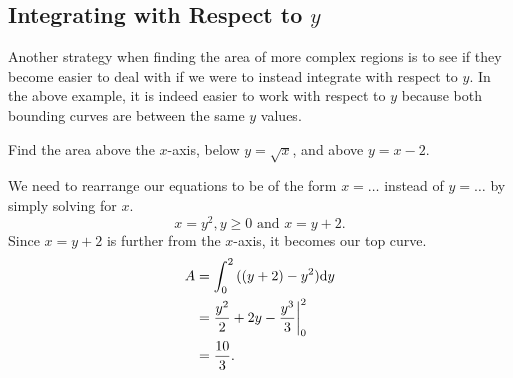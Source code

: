 \subsection{Integrating with Respect to $y$}
Another strategy when finding the area of more complex regions is to see if they become easier to deal with if we were to instead integrate with respect to $y$.
In the above example, it is indeed easier to work with respect to $y$ because both bounding curves are between the same $y$ values.
\begin{example}
	Find the area above the $x$-axis, below $y=\sqrt{x}$, and above $y=x-2$.
\end{example}
We need to rearrange our equations to be of the form $x=\ldots$ instead of $y=\ldots$ by simply solving for $x$.
\begin{equation*}
	x = y^2, y\geq 0 \text{ and } x = y+2.
\end{equation*}
\indent
Since $x=y+2$ is further from the $x$-axis, it becomes our top curve.
\begin{align*}
	A &= \int_{0}^{2}{((y+2)-y^2)\mathrm{d} y} \\
	&= \frac{y^2}{2} + 2y - \frac{y^3}{3} \biggr\rvert_0^2 \\
	&= \frac{10}{3}.
\end{align*}